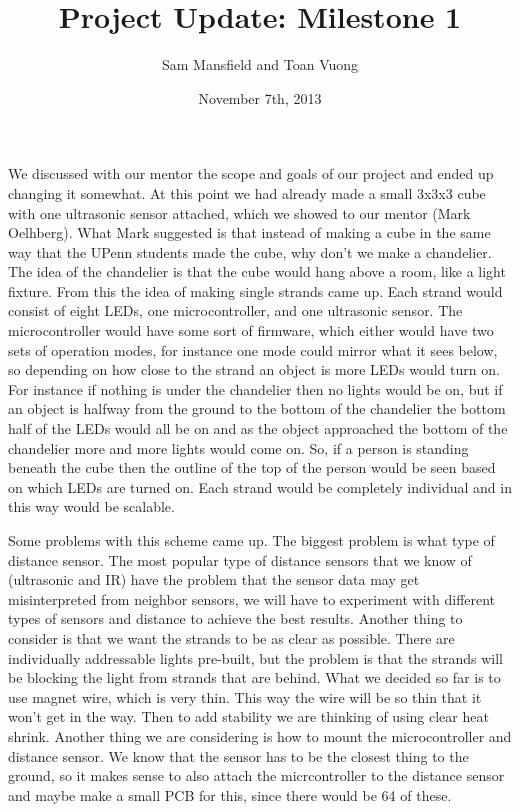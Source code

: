 \documentclass[10pt]{article}
\begin{document}
  \title{Project Update: Milestone 1}
  \author{Sam Mansfield and Toan Vuong}
  \date{November 7th, 2013}
  \maketitle

  We discussed with our mentor the scope and goals of our project and ended up changing it somewhat. At this point we had already made a small 3x3x3 cube with one ultrasonic sensor attached, which we showed to our mentor (Mark Oelhberg). What Mark suggested is that instead of making a cube in the same way that the UPenn students made the cube, why don't we make a chandelier. The idea of the chandelier is that the cube would hang above a room, like a light fixture. From this the idea of making single strands came up. Each strand would consist of eight LEDs, one microcontroller, and one ultrasonic sensor. The microcontroller would have some sort of firmware, which either would have two sets of operation modes, for instance one mode could mirror what it sees below, so depending on how close to the strand an object is more LEDs would turn on. For instance if nothing is under the chandelier then no lights would be on, but if an object is halfway from the ground to the bottom of the chandelier the bottom half of the LEDs would all be on and as the object approached the bottom of the chandelier more and more lights would come on. So, if a person is standing beneath the cube then the outline of the top of the person would be seen based on which LEDs are turned on. Each strand would be completely individual and in this way would be scalable.

  Some problems with this scheme came up. The biggest problem is what type of distance sensor. The most popular type of distance sensors that we know of (ultrasonic and IR) have the problem that the sensor data may get misinterpreted from neighbor sensors, we will have to experiment with different types of sensors and distance to achieve the best results. Another thing to consider is that we want the strands to be as clear as possible. There are individually addressable lights pre-built, but the problem is that the strands will be blocking the light from strands that are behind. What we decided so far is to use magnet wire, which is very thin. This way the wire will be so thin that it won't get in the way. Then to add stability we are thinking of using clear heat shrink. Another thing we are considering is how to mount the microcontroller and distance sensor. We know that the sensor has to be the closest thing to the ground, so it makes sense to also attach the micrcontroller to the distance sensor and maybe make a small PCB for this, since there would be 64 of these.
\end{document}
